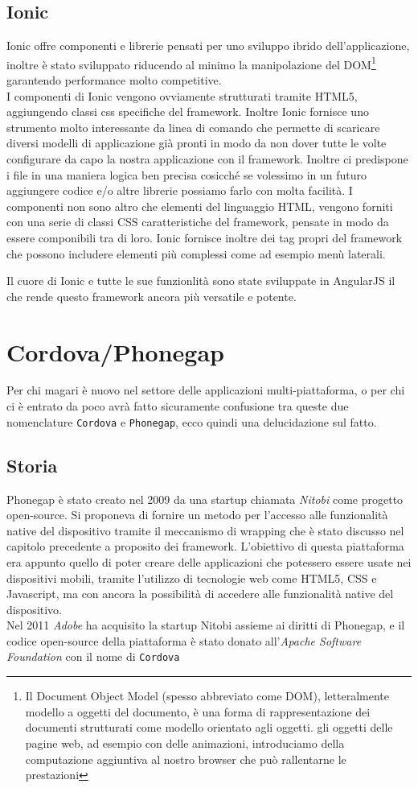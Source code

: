 \subsection{Ionic}
Ionic offre componenti e librerie pensati per uno sviluppo ibrido dell'applicazione, inoltre è stato sviluppato riducendo al minimo la manipolazione del DOM\footnote{Il Document Object Model (spesso abbreviato come DOM), letteralmente modello a oggetti del documento, è una forma di rappresentazione dei documenti strutturati come modello orientato agli oggetti.\cite{wiki:dom} gli oggetti delle pagine web, ad esempio con delle animazioni, introduciamo della computazione aggiuntiva al nostro browser che può rallentarne le prestazioni} garantendo performance molto competitive.\\
I componenti di Ionic vengono ovviamente strutturati tramite HTML5, aggiungendo classi css specifiche del framework. Inoltre 
Ionic fornisce uno strumento molto interessante da linea di comando che permette di scaricare diversi modelli di applicazione già pronti in modo da non dover tutte le volte configurare da capo la nostra applicazione con il framework. Inoltre ci predispone i file in una maniera logica ben precisa cosicché se volessimo in un futuro aggiungere codice e/o altre librerie possiamo farlo con molta facilità.
I componenti non sono altro che elementi del linguaggio HTML, vengono forniti con una serie di classi CSS caratteristiche del framework, pensate in modo da essere componibili tra di loro. Ionic fornisce inoltre dei tag propri del framework che possono includere elementi più complessi come ad esempio menù laterali.

Il cuore di Ionic e tutte le sue funzionlità sono state sviluppate in AngularJS il che rende questo framework ancora più versatile e potente.

\section{Cordova/Phonegap}
Per chi magari è nuovo nel settore delle applicazioni multi-piattaforma, o per chi ci è entrato da poco avrà fatto sicuramente confusione tra queste due nomenclature \texttt{Cordova} e \texttt{Phonegap}, ecco quindi una delucidazione sul fatto.
\subsection{Storia}
Phonegap è stato creato nel 2009 da una startup chiamata \emph{Nitobi} come progetto open-source. Si proponeva di fornire un metodo per l'accesso alle funzionalità native del dispositivo tramite il meccanismo di wrapping che è stato discusso nel capitolo precedente a proposito dei framework. L'obiettivo di questa piattaforma era appunto quello di poter creare delle applicazioni che potessero essere usate nei dispositivi mobili, tramite l'utilizzo di tecnologie web come HTML5, CSS e Javascript, ma con ancora la possibilità di accedere alle funzionalità native del dispositivo.\\
Nel 2011 \emph{Adobe} ha acquisito la startup Nitobi assieme ai diritti di Phonegap, e il codice open-source della piattaforma è stato donato all'\emph{Apache Software Foundation} con il nome di \texttt{Cordova}
